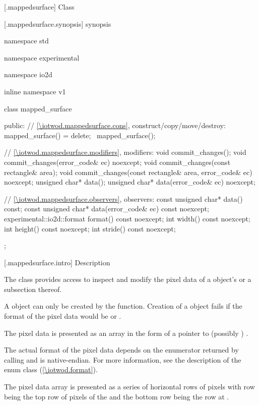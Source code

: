  [\iotwod.mappedsurface] {Class }

 [\iotwod.mappedsurface.synopsis] { synopsis}

\begin{codeblock}
namespace std { namespace experimental { namespace io2d { inline namespace v1 {
  class mapped_surface {
  public:
    // \ref{\iotwod.mappedsurface.cons}, construct/copy/move/destroy:
    mapped_surface() = delete;
    ~mapped_surface();
    
    // \ref{\iotwod.mappedsurface.modifiers}, modifiers:
    void commit_changes();
    void commit_changes(error_code& ec) noexcept;
    void commit_changes(const rectangle& area);
    void commit_changes(const rectangle& area, error_code& ec) noexcept;
    unsigned char* data();
    unsigned char* data(error_code& ec) noexcept;
    
    // \ref{\iotwod.mappedsurface.observers}, observers:
    const unsigned char* data() const;
    const unsigned char* data(error_code& ec) const noexcept;
    experimental::io2d::format format() const noexcept;
    int width() const noexcept;
    int height() const noexcept;
    int stride() const noexcept;
  };
} } } }
\end{codeblock}

 [\iotwod.mappedsurface.intro] { Description}

\pnum
{}
The  class provides access to inspect and modify the pixel data of a  object's \underlyingsurface or a subsection thereof.

\pnum
A  object can only be created by the  function. Creation of a  object fails if the format of the pixel data would be  or .

\pnum
The pixel data is presented as an array in the form of a pointer to (possibly ) .

\pnum
The actual format of the pixel data depends on the  enumerator returned by calling  and is native-endian. For more information, see the description of the  enum class (\ref{\iotwod.format}).

\pnum
The pixel data array is presented as a series of horizontal rows of pixels with row  being the top row of pixels of the \underlyingsurface and the bottom row being the row at .


